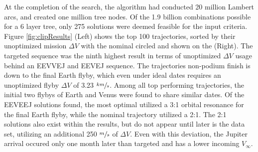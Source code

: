 \documentclass[letterpaper, preprint, paper,11pt]{AAS}	%
\begin{document}
At the completion of the search, the algorithm had conducted 20 million Lambert arcs, and created one million tree nodes. Of the 1.9 billion combinations possible for a 6 layer tree, only 275 solutions were deemed feasible for the input criteria. Figure \ref*{fig:clipResults} (Left) shows the top 100 trajectories, sorted by their unoptimized mission $\Delta V$ with the nominal circled and shown on the (Right). The targeted sequence was the ninth highest result in terms of unoptimized $\Delta V$ usage behind an EEVVEJ and EEVEJ sequence. The trajectories non-podium finish is down to the final Earth flyby, which even under ideal dates requires an unoptimized flyby $\Delta V$ of 3.23 $\sfrac{km}{s}$. Among all top performing trajectories, the initial two flybys of Earth and Venus were found to share similar dates. Of the EEVEEJ solutions found, the most optimal utilized a 3:1 orbital resonance for the final Earth flyby, while the nominal trajectory utilized a 2:1. The 2:1 solutions also exist within the results, but do not appear until later is the data set, utilizing an additional 250 $\sfrac{m}{s}$ of $\Delta V$. Even with this deviation, the Jupiter arrival occured only one month later than targeted and has a lower incoming $V_\infty$.
\end{document}
